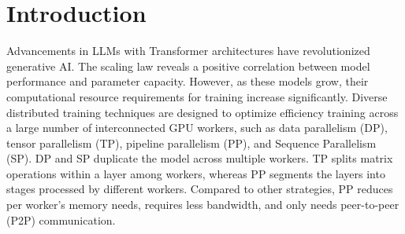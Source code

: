 \documentclass[sigplan,screen]{acmart}
\begin{document}

 


\maketitle

\section{Introduction}

Advancements in LLMs with Transformer\cite{vaswani2023attention} architectures have revolutionized generative AI. The scaling law\cite{kaplan2020scalinglawsneurallanguage} reveals a positive correlation between model performance and parameter capacity. However, as these models grow, their computational resource requirements for training increase significantly. Diverse distributed training techniques are designed to optimize efficiency training across a large number of interconnected GPU workers, such as data parallelism (DP), tensor parallelism (TP)\cite{shoeybi2019megatron, xu2021efficient, wang2022tesseract, li2023automatedtensormodelparallelism, cheng2023atpadaptivetensorparallelism}, pipeline parallelism (PP)\cite{gems, gpipe, dapple, li2021chimera, hanayo, qi2023zerobubblepipelineparallelism}, and Sequence Parallelism (SP)\cite{li2022sequence, jacobs2023Ulysses, liu2023ring, gu2024loongtrainefficienttraininglongsequence, liu2024wallfacerguidingtransformermodel}. DP and SP duplicate the model across multiple workers. TP splits matrix operations within a layer among workers, whereas PP segments the layers into stages processed by different workers. Compared to other strategies, PP reduces per worker's memory needs, requires less bandwidth, and only needs peer-to-peer (P2P) communication.
\end{document}
